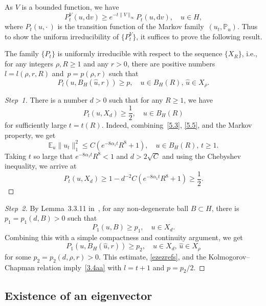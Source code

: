 \documentclass[AHL,Unicode,longabstracts]{cedram}
\newcommand{\IP}{{\mathbb P}}
\newcommand{\E}{{\mathbb E}}
\newcommand{\dd}{\mathrm{d}}
\newenvironment{step}{\begin{proof}}{\let\qed\relax \end{proof}}
\begin{document}
As $V$ is a bounded function, we have
\[
P_t^V(u,\dd v)\ge e^{-t\|V\|_\infty}P_t(u,\dd v),\quad\mbox{$u\in H$},
\]
where $P_t(u,{\cdot\,})$ is the transition function of the Markov family~$(u_t,\IP_u)$.
Thus to show the uniform irreducibility of $\{P^V_t\} $, it suffices to prove the following result.

\begin{prop}\label{P:2.7}
The family $\{P_t\} $ is uniformly irreducible with respect to the sequence $\{X_R\}$, i.e., for any integers $\rho, R\ge1$ and any $r>0$, there are positive numbers $l=l(\rho,r,R)$ and~$p=p(\rho,r)$ such that
\begin{equation}\label{3.4aa}
P_l(u,B_{H}(\hat u,r))\ge p,\quad\mbox{$u\in B_H(R),\,\hat u\in X_\rho$}.
\end{equation}
\end{prop}

\begin{proofc}

\begin{step}[Step~1]
There is a number $d>0$ such that for any $R\ge1$, we have
\begin{equation}\label{ezezrefs}
P_t(u, X_{d})\ge\frac12, \quad\mbox{$u\in B_H(R)$}
\end{equation}
for sufficiently large $t=t(R)$. Indeed, combining~\eqref{5.3}, \eqref{5.5}, and the Markov property, we get
\[
\E_u \|u_t\|_1^{2}\le C(e^{-8\alpha_1 t} R^{8}+1),\quad\mbox{$u\in B_H(R)$, $t\ge1$}.
\]
Taking $t$ so large that $e^{-8\alpha_1 t} R^{8}<1$ and $d >2\sqrt{ C} $ and using the Chebyshev inequality, we arrive at
\[
P_t(u, X_{d})\ge 1- d^{-2}C(e^{-8\alpha_1 t} R^{8}+1) \ge \frac12.
\]
\end{step}

\begin{proof}[Step~2]
By Lemma~3.3.11 in~\cite{KS-book}, for any non-degenerate ball $B \subset H$, there is~$p_1= p_1(d,B)>0$ such that
\[
P_1(u, B)\ge p_1,\quad\mbox{$u\in X_{d}$}.
\]
Combining this with a simple compactness and continuity argument, we get
\[
P_1(u, B_{H}(\hat u,r))\ge p_2,\quad\mbox{$u\in X_{d},\, \hat u\in X_\rho$}
\]
for some $p_2=p_2(d,\rho,r)>0$. This estimate, \eqref{ezezrefs}, and the Kolmogorov--Chapman relation imply~\eqref{3.4aa} with $l=t+1$ and $p=p_2/2$.
\end{proof}
\let\qed\relax
\end{proofc}

\subsection{Existence of an eigenvector}\label{S:2.4}
\end{document}
